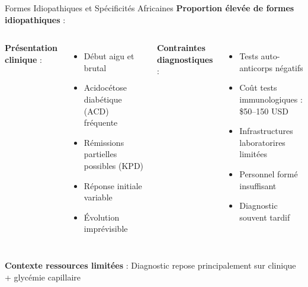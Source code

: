 \documentclass[11pt, aspectratio=169]{beamer}
\begin{document}
\begin{frame}{Formes Idiopathiques et Spécificités Africaines}
  \textbf{\textcolor{accent1}{Proportion élevée de formes idiopathiques}} :
  
  \vspace{0.8em}
  
  \begin{columns}[T]
    \textbf{\color{accent2} Présentation clinique} :
    \begin{itemize}
      \item Début aigu et brutal
      \item Acidocétose diabétique (ACD) fréquente
      \item Rémissions partielles possibles (KPD)
      \item Réponse initiale variable
      \item Évolution imprévisible
    \end{itemize}
    
    \textbf{\color{accent1} Contraintes diagnostiques} :
    \begin{itemize}
      \item Tests auto-anticorps négatifs
      \item Coût tests immunologiques : \$50--150 USD
      \item Infrastructures laboratorires limitées
      \item Personnel formé insuffisant
      \item Diagnostic souvent tardif
    \end{itemize}
  \end{columns}
  
  \vspace{1em}
  
  \textcolor{accent1}{\textbf{Contexte ressources limitées}} : Diagnostic repose principalement sur clinique + glycémie capillaire
\end{frame}
\end{document}
